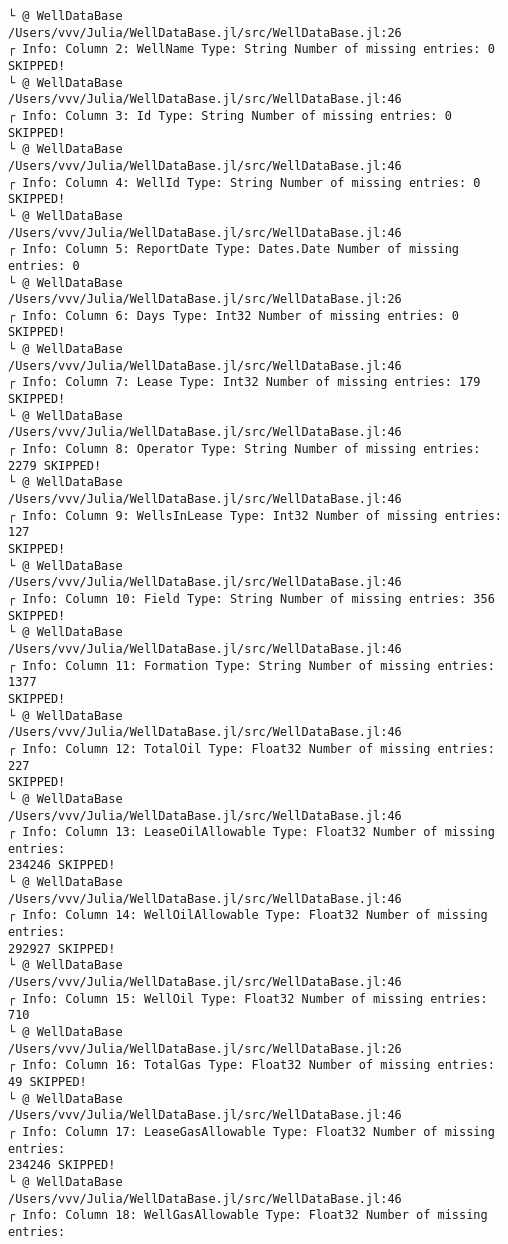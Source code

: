 \documentclass[11pt]{article}
\begin{document}
\begin{Verbatim}[commandchars=\\\{\}]
└ @ WellDataBase /Users/vvv/Julia/WellDataBase.jl/src/WellDataBase.jl:26
┌ Info: Column 2: WellName Type: String Number of missing entries: 0 SKIPPED!
└ @ WellDataBase /Users/vvv/Julia/WellDataBase.jl/src/WellDataBase.jl:46
┌ Info: Column 3: Id Type: String Number of missing entries: 0 SKIPPED!
└ @ WellDataBase /Users/vvv/Julia/WellDataBase.jl/src/WellDataBase.jl:46
┌ Info: Column 4: WellId Type: String Number of missing entries: 0 SKIPPED!
└ @ WellDataBase /Users/vvv/Julia/WellDataBase.jl/src/WellDataBase.jl:46
┌ Info: Column 5: ReportDate Type: Dates.Date Number of missing entries: 0
└ @ WellDataBase /Users/vvv/Julia/WellDataBase.jl/src/WellDataBase.jl:26
┌ Info: Column 6: Days Type: Int32 Number of missing entries: 0 SKIPPED!
└ @ WellDataBase /Users/vvv/Julia/WellDataBase.jl/src/WellDataBase.jl:46
┌ Info: Column 7: Lease Type: Int32 Number of missing entries: 179 SKIPPED!
└ @ WellDataBase /Users/vvv/Julia/WellDataBase.jl/src/WellDataBase.jl:46
┌ Info: Column 8: Operator Type: String Number of missing entries: 2279 SKIPPED!
└ @ WellDataBase /Users/vvv/Julia/WellDataBase.jl/src/WellDataBase.jl:46
┌ Info: Column 9: WellsInLease Type: Int32 Number of missing entries: 127
SKIPPED!
└ @ WellDataBase /Users/vvv/Julia/WellDataBase.jl/src/WellDataBase.jl:46
┌ Info: Column 10: Field Type: String Number of missing entries: 356 SKIPPED!
└ @ WellDataBase /Users/vvv/Julia/WellDataBase.jl/src/WellDataBase.jl:46
┌ Info: Column 11: Formation Type: String Number of missing entries: 1377
SKIPPED!
└ @ WellDataBase /Users/vvv/Julia/WellDataBase.jl/src/WellDataBase.jl:46
┌ Info: Column 12: TotalOil Type: Float32 Number of missing entries: 227
SKIPPED!
└ @ WellDataBase /Users/vvv/Julia/WellDataBase.jl/src/WellDataBase.jl:46
┌ Info: Column 13: LeaseOilAllowable Type: Float32 Number of missing entries:
234246 SKIPPED!
└ @ WellDataBase /Users/vvv/Julia/WellDataBase.jl/src/WellDataBase.jl:46
┌ Info: Column 14: WellOilAllowable Type: Float32 Number of missing entries:
292927 SKIPPED!
└ @ WellDataBase /Users/vvv/Julia/WellDataBase.jl/src/WellDataBase.jl:46
┌ Info: Column 15: WellOil Type: Float32 Number of missing entries: 710
└ @ WellDataBase /Users/vvv/Julia/WellDataBase.jl/src/WellDataBase.jl:26
┌ Info: Column 16: TotalGas Type: Float32 Number of missing entries: 49 SKIPPED!
└ @ WellDataBase /Users/vvv/Julia/WellDataBase.jl/src/WellDataBase.jl:46
┌ Info: Column 17: LeaseGasAllowable Type: Float32 Number of missing entries:
234246 SKIPPED!
└ @ WellDataBase /Users/vvv/Julia/WellDataBase.jl/src/WellDataBase.jl:46
┌ Info: Column 18: WellGasAllowable Type: Float32 Number of missing entries:

\end{Verbatim}
\end{document}
